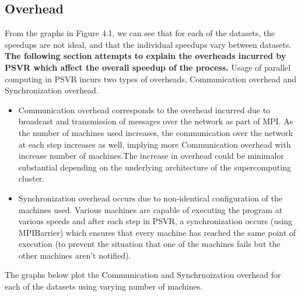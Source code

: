 \documentclass[12pt]{article}
\begin{document}
\subsection{Overhead}
\label{Overhead}
From the graphs in Figure 4.1, we can see that for each of the datasets, the speedups are not ideal, and that the individual speedups vary between datasets.
{\bf The following section attempts to explain the overheads incurred by PSVR which affect the overall speedup of the process.}
\newline\newline
Usage of parallel computing in PSVR incurs two types of overheads, Communication overhead and Synchronization overhead.
\begin{itemize}
\item Communication overhead corresponds to the overhead incurred due to broadcast and transmission of messages over the network as part of MPI. 
\newline
As the number of machines used increases, the communication over the network at each step increases as well, implying more Communication overhead with increase number of machines.The increase in overhead could be minimal\footnotemark or substantial depending on the underlying architecture of the supercomputing cluster.
\item Synchronization overhead occurs due to non-identical configuration of the machines used. Various machines are capable of executing the program at various speeds and after each step in PSVR, a synchronization occurs (using MPIBarrier) which ensures that every machine has reached the same point of execution (to prevent the situation that one of the machines fails but the other machines aren't notified).
\end{itemize}
The graphs below plot the Communication and Synchrnoization overhead for each of the datasets using varying number of machines.
\end{document}
